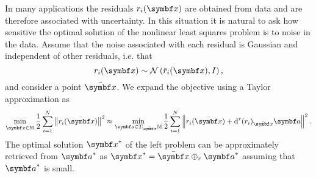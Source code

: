 In many applications the residuals $r_{i}(\x)$ are obtained from data and are therefore associated with uncertainty. In this situation it is natural to ask how sensitive the optimal solution of the nonlinear least squares problem is to noise in the data. Assume that the noise associated with each residual is Gaussian and independent of other residuals, i.e. that
\begin{equation}
  r_{i}(\x) \sim \mathcal N\left(\bar r_{i}(\x), I \right),
\end{equation}
and consider a point $\bar \x$. We expand the objective using a Taylor approximation as
\begin{equation}
  \min_{\bar \x \in \M} \frac{1}{2} \sum_{i=1}^{N} \left\| r_{i}(\bar \x) \right\|^{2} \approx \min_{\a \in T_{\bar \x} \M} \frac{1}{2}  \sum_{i=1}^{N} \left\| r_{i}(\bar \x) + \mathrm{d}^{r} (r_{i})_{\bar \x} \a \right\|^{2}.
\end{equation}
The optimal solution $\x^{*}$ of the left problem can be approximately retrieved from $\a^{*}$ as $\x^{*} = \bar \x \oplus_{r} \a^{*}$ assuming that $\a^{*}$ is small.

